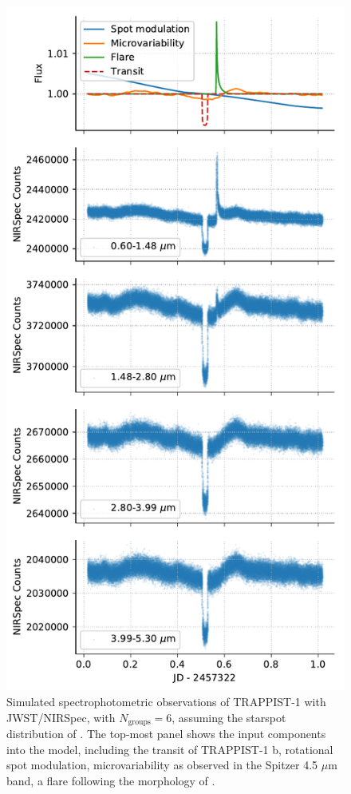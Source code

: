 \begin{figure}
\centering
\includegraphics[scale=0.65]{libra/breakdown_long.pdf}
\caption{Simulated spectrophotometric observations of TRAPPIST-1 with JWST/NIRSpec, with $N_\mathrm{groups} = 6$, assuming the starspot distribution of \citet{Morris2018c}. The top-most panel shows the input components into the model, including the transit of TRAPPIST-1 b, rotational spot modulation, microvariability as observed in the Spitzer 4.5 $\mu$m band, a flare following the morphology of \citet{Davenport2014}.}
\label{fig:breakdownt1}
\end{figure}


